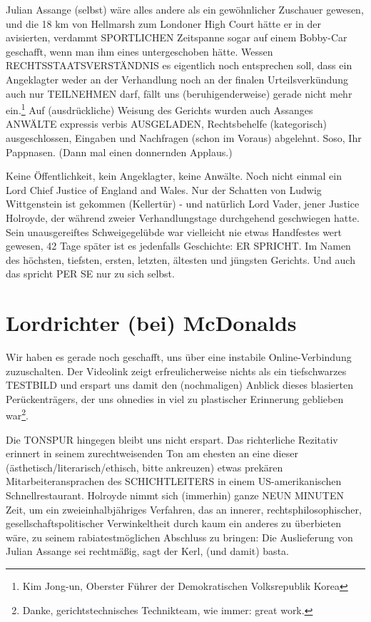 \begin{multicols}{2}
Julian Assange (selbst) wäre alles andere als ein gewöhnlicher Zuschauer gewesen, und die 18 km von Hellmarsh
zum Londoner High Court hätte er in der avisierten, verdammt SPORTLICHEN Zeitspanne sogar auf einem Bobby-Car geschafft, wenn man ihm eines untergeschoben
hätte. Wessen RECHTSSTAATSVERSTÄNDNIS es eigentlich noch entsprechen soll, dass ein Angeklagter weder
an der Verhandlung noch an der finalen Urteilsverkündung auch nur TEILNEHMEN darf, fällt uns (beruhigenderweise) gerade nicht mehr ein.\footnote[27]{Kim Jong-un, Oberster Führer der Demokratischen Volksrepublik Korea} Auf (ausdrückliche)
Weisung des Gerichts wurden auch Assanges ANWÄLTE
expressis verbis AUSGELADEN, Rechtsbehelfe (kategorisch) ausgeschlossen, Eingaben und Nachfragen (schon
im Voraus) abgelehnt. Soso, Ihr Pappnasen. (Dann mal
einen donnernden Applaus.)

Keine Öffentlichkeit, kein Angeklagter, keine Anwälte.
Noch nicht einmal ein Lord Chief Justice of England and
Wales. Nur der Schatten von Ludwig Wittgenstein ist gekommen (Kellertür) - und natürlich Lord Vader, jener
Justice Holroyde, der während zweier Verhandlungstage
durchgehend geschwiegen hatte. Sein unausgereiftes
Schweigegelübde war vielleicht nie etwas Handfestes
wert gewesen, 42 Tage später ist es jedenfalls Geschichte:
ER SPRICHT. Im Namen des höchsten, tiefsten, ersten,
letzten, ältesten und jüngsten Gerichts. Und auch das
spricht PER SE nur zu sich selbst.

\section{Lordrichter (bei) McDonalds}

Wir haben es gerade noch geschafft, uns über eine instabile Online-Verbindung zuzuschalten. Der Videolink zeigt erfreulicherweise nichts als ein tiefschwarzes
TESTBILD und erspart uns damit den (nochmaligen)
Anblick dieses blasierten Perückenträgers, der uns ohnedies in viel zu plastischer Erinnerung geblieben war\footnote[28]{Danke, gerichtstechnisches Technikteam, wie immer: great work.}.

Die TONSPUR hingegen bleibt uns nicht erspart. Das
richterliche Rezitativ erinnert in seinem zurechtweisenden Ton am ehesten an eine dieser (ästhetisch/literarisch/ethisch, bitte ankreuzen) etwas prekären Mitarbeiteransprachen des SCHICHTLEITERS in einem
US-amerikanischen Schnellrestaurant. Holroyde nimmt
sich (immerhin) ganze NEUN MINUTEN Zeit, um ein
zweieinhalbjähriges Verfahren, das an innerer, rechtsphilosophischer, gesellschaftspolitischer Verwinkeltheit
durch kaum ein anderes zu überbieten wäre, zu seinem
rabiatestmöglichen Abschluss zu bringen: Die Auslieferung von Julian Assange sei rechtmäßig, sagt der Kerl,
(und damit) basta.


\end{multicols}
